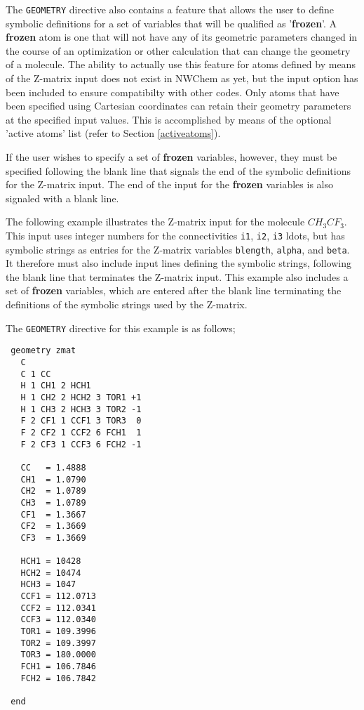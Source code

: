 The \verb+GEOMETRY+ directive also contains a feature that allows the user
to define symbolic definitions for a set of variables that will be 
qualified as '{\bf frozen}'.  A {\bf frozen} atom is one that will not
have any of its geometric parameters changed in the course of an optimization
or other calculation that can change the geometry of a molecule.  
The ability to actually use this feature
for atoms defined by means of the Z-matrix input does not exist in NWChem
as yet, but the input option has been included to ensure compatibilty with
other codes.  Only atoms that have been specified using Cartesian coordinates
can retain their geometry parameters at the specified input values.  This
is accomplished by means of the optional 'active atoms' list (refer to Section
\ref{activeatoms}).

If the user wishes to specify a set of {\bf frozen} variables, however,
they must be specified following the blank line that signals the end of 
the symbolic definitions for the Z-matrix input.  The end of the input
for the {\bf frozen} variables is also signaled with a blank line.

The following example illustrates the Z-matrix input for the molecule
$CH_3CF_3$.  This input uses integer numbers for the connectivities {\tt i1},
{\tt i2}, {\tt i3} ldots, but has symbolic strings as entries for the Z-matrix
variables {\tt blength}, {\tt alpha}, and {\tt beta}.  It therefore must
also include input lines defining the symbolic strings, following the blank
line that terminates the Z-matrix input.  This example also includes a set
of {\bf frozen} variables, which are entered after the blank line terminating
the definitions of the symbolic strings used by the Z-matrix.




The \verb+GEOMETRY+ directive for this example is as follows;

\begin{verbatim}
 geometry zmat
   C 
   C 1 CC 
   H 1 CH1 2 HCH1 
   H 1 CH2 2 HCH2 3 TOR1 +1 
   H 1 CH3 2 HCH3 3 TOR2 -1 
   F 2 CF1 1 CCF1 3 TOR3  0 
   F 2 CF2 1 CCF2 6 FCH1  1 
   F 2 CF3 1 CCF3 6 FCH2 -1

   CC   = 1.4888 
   CH1  = 1.0790 
   CH2  = 1.0789  
   CH3  = 1.0789  
   CF1  = 1.3667 
   CF2  = 1.3669 
   CF3  = 1.3669

   HCH1 = 10428 
   HCH2 = 10474 
   HCH3 = 1047 
   CCF1 = 112.0713 
   CCF2 = 112.0341 
   CCF3 = 112.0340 
   TOR1 = 109.3996 
   TOR2 = 109.3997 
   TOR3 = 180.0000 
   FCH1 = 106.7846 
   FCH2 = 106.7842

 end   
\end{verbatim}

